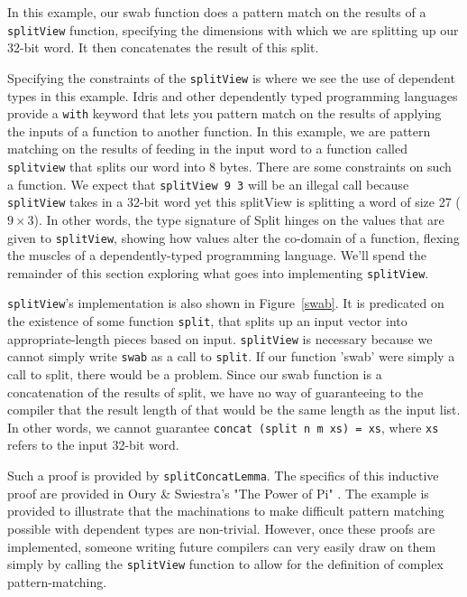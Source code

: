 In this example, our swab function does a pattern match on the results of a
\texttt{splitView} function, specifying the dimensions with which we are
splitting up our 32-bit word. It then concatenates the result of this split. 

Specifying the constraints of the \texttt{splitView} is where we see the use of
dependent types in this example. Idris and other dependently typed programming
languages provide a \texttt{with} keyword that lets you pattern match on the
results of applying the inputs of a function to another function. In this
example, we are pattern matching on the results of feeding in the input word to
a function called \texttt{splitview} that splits our word into 8 bytes. There
are some constraints on such a function. We expect that \texttt{splitView 9 3}
will be an illegal call because \texttt{splitView} takes in a 32-bit word yet
this splitView is splitting a word of size 27 ($9 \times 3$). In other words,
the type signature of Split hinges on the values that are given to
\texttt{splitView}, showing how values alter the co-domain of a function,
flexing the muscles of a dependently-typed programming language. We'll spend the
remainder of this section exploring what goes into implementing
\texttt{splitView}. 

\texttt{splitView}'s implementation is also shown in Figure~\ref{swab}. It is
predicated on the existence of some function \texttt{split}, that splits up an
input vector into appropriate-length pieces based on input. \texttt{splitView}
is necessary because we cannot simply write \texttt{swab} as a call to
\texttt{split}. If our function 'swab' were simply a call to split, there would
be a problem. Since our swab function is a concatenation of the results of
split, we have no way of guaranteeing to the compiler that the result length of
that would be the same length as the input list. In other words, we cannot
guarantee \texttt{concat (split n m xs) = xs}, where \texttt{xs} refers to the
input 32-bit word. 

Such a proof is provided by \texttt{splitConcatLemma}. The specifics of this
inductive proof are provided in Oury \& Swiestra's "The Power of Pi"
\cite{power_of_pi}. The example is provided to illustrate that the machinations
to make difficult pattern matching possible with dependent types are
non-trivial. However, once these proofs are implemented, someone writing future
compilers can very easily draw on them simply by calling the \texttt{splitView}
function to allow for the definition of complex pattern-matching. 

